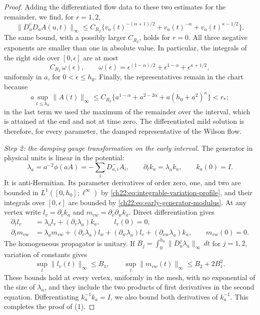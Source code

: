 \begin{proof}
Adding the differentiated flow data to these two estimates for the remainder, we find, for $r=1,2$,
\begin{equation}\label{ch22:eq:integrable-variation-profile}
 \|D_u^rD_aA(u,t)\|_\infty\le C_{R_2}\bigl\{v_a(t)^{-(\alpha+1)/2}+v_a(t)^{-\alpha}+v_a(t)^{\kappa-1/2}\bigr\}.
\end{equation}
The same bound, with a possibly larger $C_{R_2}$, holds for $r=0$. All three negative exponents are smaller than one in absolute value. In particular, the integrals of the right side over $[0,\epsilon]$ are at most
\begin{equation}\label{ch22:eq:early-generator-modulus}
 C_{R_2}\,\omega(\epsilon),\qquad \omega(\epsilon)=\epsilon^{(1-\alpha)/2}+\epsilon^{1-\alpha}+\epsilon^{\kappa+1/2},
\end{equation}
uniformly in $a$, for $0<\epsilon\le h_0$. Finally, the representatives remain in the chart because
\[
 a\sup_{t\le h_0}\|A(t)\|_\infty\le C_{R_2}\bigl\{a^{1-\alpha}+a^{2-2\alpha}+a(h_0+a^2)^\kappa\bigr\}<r_* ;
\]
in the last term we used the maximum of the remainder over the interval, which is attained at the end and not at time zero. The differentiated mild solution is therefore, for every parameter, the damped representative of the Wilson flow.

\emph{Step 2: the damping gauge transformation on the early interval.} The generator in physical units is linear in the potential:
\begin{equation}\label{ch22:eq:linear-divergence-generator}
 \lambda_a=a^{-2}\phi(aA)=-\sum_iD_{a,i}^-A_i,\qquad \partial_tk_a=\lambda_ak_a,\qquad k_a(0)=I .
\end{equation}
It is anti-Hermitian. Its parameter derivatives of order zero, one, and two are bounded in $L^1([0,h_0];\ell^\infty)$ by \eqref{ch22:eq:integrable-variation-profile}, and their integrals over $[0,\epsilon]$ are bounded by \eqref{ch22:eq:early-generator-modulus}. At any vertex write $l_v=\partial_vk_a$ and $m_{vw}=\partial_v\partial_wk_a$. Direct differentiation gives
\begin{equation}\label{ch22:eq:gauge-two-variations}
 \begin{aligned}
 \partial_tl_v&=\lambda_al_v+(\partial_v\lambda_a)k_a,\qquad l_v(0)=0,\\
 \partial_tm_{vw}&=\lambda_am_{vw}+(\partial_v\lambda_a)l_w+(\partial_w\lambda_a)l_v+(\partial_{vw}\lambda_a)k_a,\qquad m_{vw}(0)=0.
 \end{aligned}
\end{equation}
The homogeneous propagator is unitary. If $B_j=\int_0^{h_0}\|D_u^j\lambda_a\|_\infty\,dt$ for $j=1,2$, variation of constants gives
\[
 \sup_t\|l_v(t)\|_\infty\le B_1,\qquad \sup_t\|m_{vw}(t)\|_\infty\le B_2+2B_1^2 .
\]
These bounds hold at every vertex, uniformly in the mesh, with no exponential of the size of $\lambda_a$, and they include the two products of first derivatives in the second equation. Differentiating $k_a^{-1}k_a=I$, we also bound both derivatives of $k_a^{-1}$. This completes the proof of (1).


\end{proof}
